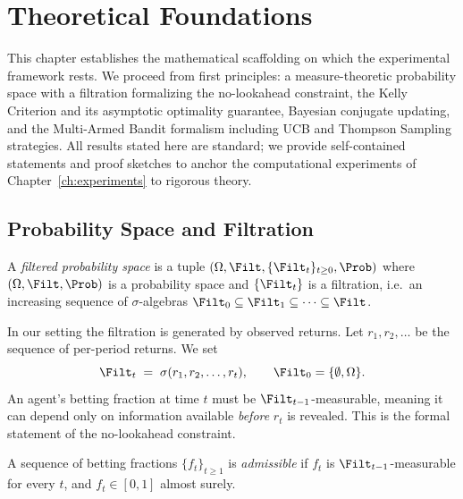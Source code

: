 \chapter{Theoretical Foundations}
\label{ch:foundations}

This chapter establishes the mathematical scaffolding on which the experimental
framework rests.  We proceed from first principles: a measure-theoretic
probability space with a filtration formalizing the no-lookahead constraint,
the Kelly Criterion and its asymptotic optimality guarantee, Bayesian conjugate
updating, and the Multi-Armed Bandit formalism including UCB and Thompson
Sampling strategies.  All results stated here are standard; we provide
self-contained statements and proof sketches to anchor the computational
experiments of Chapter~\ref{ch:experiments} to rigorous theory.

\section{Probability Space and Filtration}

\begin{definition}
A \emph{filtered probability space} is a tuple $(\Omega, \Filt, \{\Filt_t\}_{t \geq 0}, \Prob)$
where $(\Omega, \Filt, \Prob)$ is a probability space and
$\{\Filt_t\}$ is a filtration, i.e.\ an increasing sequence of
$\sigma$-algebras $\Filt_0 \subseteq \Filt_1 \subseteq \cdots \subseteq \Filt$.
\end{definition}

In our setting the filtration is generated by observed returns.  Let
$r_1, r_2, \ldots$ be the sequence of per-period returns.  We set
\[
    \Filt_t \;=\; \sigma(r_1, r_2, \ldots, r_t), \qquad \Filt_0 = \{\emptyset, \Omega\}.
\]
An agent's betting fraction at time $t$ must be $\Filt_{t-1}$-measurable,
meaning it can depend only on information available \emph{before} $r_t$ is
revealed.  This is the formal statement of the no-lookahead constraint.

\begin{definition}
A sequence of betting fractions $\{f_t\}_{t \geq 1}$ is \emph{admissible} if
$f_t$ is $\Filt_{t-1}$-measurable for every $t$, and $f_t \in [0,1]$
almost surely.
\end{definition}

